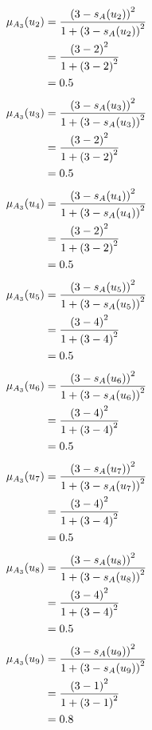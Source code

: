 \documentclass[a4paper,openany]{book}
\begin{document}
				\begin{align}
					\mu_{A_3}(u_2) &= \frac{\left(3-s_A(u_2)\right)^2}{1 + \left(3-s_A(u_2)\right)^2}\\
					&= \frac{\left(3-2\right)^2}{1 + \left(3-2\right)^2} \notag \\
					&= 0.5 \notag
				\end{align}
				\begin{align}
					\mu_{A_3}(u_3) &= \frac{\left(3-s_A(u_3)\right)^2}{1 + \left(3-s_A(u_3)\right)^2}\\
					&= \frac{\left(3-2\right)^2}{1 + \left(3-2\right)^2} \notag \\
					&= 0.5 \notag
				\end{align}
				\begin{align}
					\mu_{A_3}(u_4) &= \frac{\left(3-s_A(u_4)\right)^2}{1 + \left(3-s_A(u_4)\right)^2}\\
					&= \frac{\left(3-2\right)^2}{1 + \left(3-2\right)^2} \notag \\
					&= 0.5 \notag
				\end{align}
				\begin{align}
					\mu_{A_3}(u_5) &= \frac{\left(3-s_A(u_5)\right)^2}{1 + \left(3-s_A(u_5)\right)^2}\\
					&= \frac{\left(3-4\right)^2}{1 + \left(3-4\right)^2} \notag \\
					&= 0.5 \notag
				\end{align}
				\begin{align}
					\mu_{A_3}(u_6) &= \frac{\left(3-s_A(u_6)\right)^2}{1 + \left(3-s_A(u_6)\right)^2}\\
					&= \frac{\left(3-4\right)^2}{1 + \left(3-4\right)^2} \notag \\
					&= 0.5 \notag
				\end{align}
				\begin{align}
					\mu_{A_3}(u_7) &= \frac{\left(3-s_A(u_7)\right)^2}{1 + \left(3-s_A(u_7)\right)^2}\\
					&= \frac{\left(3-4\right)^2}{1 + \left(3-4\right)^2} \notag \\
					&= 0.5 \notag
				\end{align}
				\begin{align}
					\mu_{A_3}(u_8) &= \frac{\left(3-s_A(u_8)\right)^2}{1 + \left(3-s_A(u_8)\right)^2}\\
					&= \frac{\left(3-4\right)^2}{1 + \left(3-4\right)^2} \notag \\
					&= 0.5 \notag
				\end{align}
				\begin{align}
					\mu_{A_3}(u_9) &= \frac{\left(3-s_A(u_9)\right)^2}{1 + \left(3-s_A(u_9)\right)^2}\\
					&= \frac{\left(3-1\right)^2}{1 + \left(3-1\right)^2} \notag \\
					&= 0.8 \notag
				\end{align}
\end{document}
